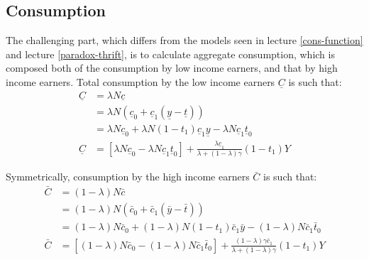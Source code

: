 \documentclass[]{book}
\begin{document}
\subsection{Consumption}\label{consumption}

The challenging part, which differs from the models seen in lecture
\ref{cons-function} and lecture \ref{paradox-thrift}, is to calculate
aggregate consumption, which is composed both of the consumption by low
income earners, and that by high income earners. Total consumption by
the low income earners \(\underline{C}\) is such that: \[
\begin{aligned}
\underline{C}&=\lambda N \underline{c}\\
&=\lambda N \left(\underline{c}_{0}+\underline{c}_{1}(\underline{y}-\underline{t})\right)\\
&=\lambda N  \underline{c}_{0} + \lambda N  (1-t_1) \underline{c}_{1}\underline{y}-\lambda N  \underline{c}_{1} \underline{t}_0\\
\underline{C}&=\left[\lambda N  \underline{c}_{0}-\lambda  N \underline{c}_{1} \underline{t}_0 \right]+ \frac{\lambda \underline{c}_{1}}{\lambda+(1-\lambda)\gamma}(1-t_1)Y
\end{aligned}
\]

Symmetrically, consumption by the high income earners \(\bar{C}\) is
such that: \[
\begin{aligned}
\bar{C}&=(1-\lambda) N \bar{c}\\
&=(1-\lambda) N \left(\bar{c}_{0}+\bar{c}_{1}(\bar{y}-\bar{t})\right)\\
&=(1-\lambda) N  \bar{c}_{0} + (1-\lambda) N (1-t_1) \bar{c}_{1}\bar{y}-(1-\lambda) N  \bar{c}_{1} \bar{t}_0\\
\bar{C}&=\left[(1-\lambda) N  \bar{c}_{0}-(1-\lambda) N  \bar{c}_{1} \bar{t}_0\right] + \frac{(1-\lambda) \gamma\bar{c}_{1}}{\lambda+(1-\lambda)\gamma}(1-t_1)Y
\end{aligned}
\]
\end{document}
